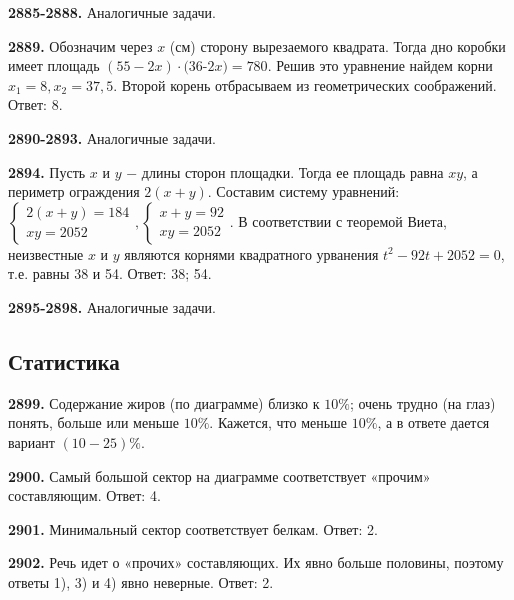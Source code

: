 \textbf{2885-2888.} Аналогичные задачи.

\textbf{2889.} Обозначим через $x$ (см) сторону вырезаемого квадрата. Тогда дно коробки имеет площадь $(55 - 2x)\cdot(36 $-$ 2x)=780$. Решив это уравнение найдем корни $x_1=8, x_2=37,5.$ Второй корень отбрасываем из геометрических соображений. \newline \null \hspace*{\fill} Ответ: 8. 

\textbf{2890-2893.} Аналогичные задачи.

\textbf{2894.} Пусть $x$ и $y$ $-$ длины сторон площадки. Тогда ее площадь равна $xy$, а периметр ограждения $2(x+y).$ Составим систему уравнений:\newline$
\begin{cases}
	2(x+y)=184\\
	xy=2052
\end{cases},
\begin{cases}
	x + y = 92\\
	xy=2052
\end{cases}$.
В соответствии с теоремой Виета, неизвестные $x$ и $y$ являются корнями квадратного урванения $t^2 - 92t + 2052 = 0$, т.е. равны 38 и 54. \newline \null \hspace*{\fill} Ответ: 38; 54. 

\textbf{2895-2898.} Аналогичные задачи.


\subsection{Статистика}

\textbf{2899.} Содержание жиров (по диаграмме) близко к $10\%$; очень трудно (на глаз) понять, больше или меньше $10\%.$ Кажется, что меньше $10\%$, а в ответе дается вариант  $(10-25)\%$.

\textbf{2900.} Самый большой сектор на диаграмме соответствует «прочим» составляющим. \newline \null \hspace*{\fill} Ответ: 4. 

\textbf{2901.} Минимальный сектор соответствует белкам. \newline \null \hspace*{\fill} Ответ: 2. 

\textbf{2902.} Речь идет о «прочих» составляющих. Их явно больше половины, поэтому ответы 1), 3) и 4) явно неверные. \newline \null \hspace*{\fill} Ответ: 2. 

